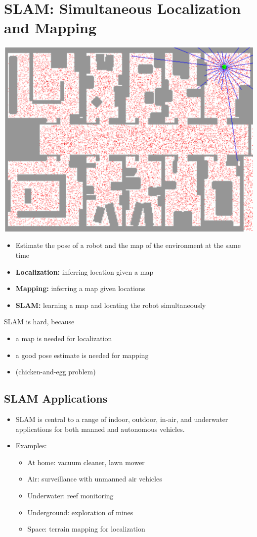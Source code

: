 \documentclass[10pt]{article}
\begin{document}
\section*{SLAM: Simultaneous Localization and Mapping}
\begin{center} 
	\includegraphics*[width=\textwidth]{L1_13.png} 
\end{center}
\begin{itemize}
	\item Estimate the pose of a robot and the map of the environment at the same time
	\item \textbf{Localization:} inferring location given a map
	\item \textbf{Mapping:} inferring a map given locations
	\item \textbf{SLAM:} learning a map and locating the robot simultaneously
\end{itemize}
SLAM is hard, because
\begin{itemize}
	\item a map is needed for localization
	\item a good pose estimate is needed for mapping
	\item (chicken-and-egg problem)
\end{itemize}

\subsection*{SLAM Applications}
\begin{itemize}
	\item SLAM is central to a range of indoor, outdoor, in-air, and underwater applications for both manned and autonomous vehicles.
	\item Examples:
	\begin{itemize}
        \item At home: vacuum cleaner, lawn mower
        \item Air: surveillance with unmanned air vehicles
        \item Underwater: reef monitoring
        \item Underground: exploration of mines
        \item Space: terrain mapping for localization
    \end{itemize}
\end{itemize}
\end{document}
